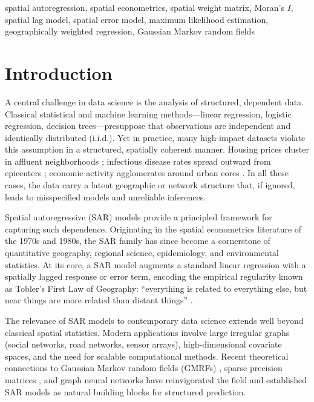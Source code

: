 \documentclass[conference]{IEEEtran}
\theoremstyle{definition}
\begin{document}
\begin{IEEEkeywords}
spatial autoregression, spatial econometrics, spatial weight matrix, Moran's $I$, spatial lag model, spatial error model, maximum likelihood estimation, geographically weighted regression, Gaussian Markov random fields
\end{IEEEkeywords}

\section{Introduction}

A central challenge in data science is the analysis of structured, dependent data. Classical statistical and machine learning methods---linear regression, logistic regression, decision trees---presuppose that observations are independent and identically distributed (i.i.d.). Yet in practice, many high-impact datasets violate this assumption in a structured, spatially coherent manner. Housing prices cluster in affluent neighborhoods \cite{anselin1988spatial}; infectious disease rates spread outward from epicenters \cite{lawson2013statistical}; economic activity agglomerates around urban cores \cite{lesage2009introduction}. In all these cases, the data carry a latent geographic or network structure that, if ignored, leads to misspecified models and unreliable inferences.

Spatial autoregressive (SAR) models provide a principled framework for capturing such dependence. Originating in the spatial econometrics literature of the 1970s and 1980s, the SAR family has since become a cornerstone of quantitative geography, regional science, epidemiology, and environmental statistics. At its core, a SAR model augments a standard linear regression with a spatially lagged response or error term, encoding the empirical regularity known as Tobler's First Law of Geography: ``everything is related to everything else, but near things are more related than distant things'' \cite{tobler1970computer}.

The relevance of SAR models to contemporary data science extends well beyond classical spatial statistics. Modern applications involve large irregular graphs (social networks, road networks, sensor arrays), high-dimensional covariate spaces, and the need for scalable computational methods. Recent theoretical connections to Gaussian Markov random fields (GMRFs) \cite{rue2005gaussian}, sparse precision matrices \cite{datta2016hierarchical}, and graph neural networks \cite{kipf2017semi} have reinvigorated the field and established SAR models as natural building blocks for structured prediction.
\end{document}
